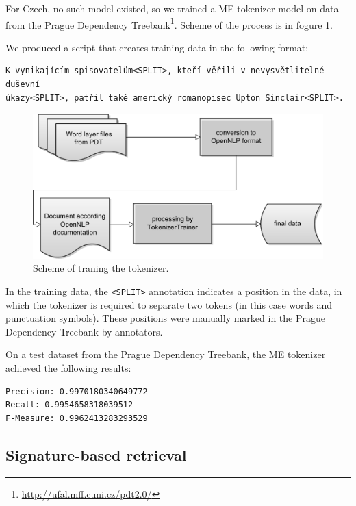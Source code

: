 For Czech, no such model existed, so we trained a ME tokenizer
model on data from the Prague Dependency Treebank\footnote{\url{http://ufal.mff.cuni.cz/pdt2.0/}}. Scheme of the process is in fogure \ref{fig:tokenizer}. 

We produced a script that creates training data in the following format:
\begin{verbatim}
K vynikajícím spisovatelům<SPLIT>, kteří věřili v nevysvětlitelné duševní 
úkazy<SPLIT>, patřil také americký romanopisec Upton Sinclair<SPLIT>.
\end{verbatim}

\begin{figure}[h]
\begin{center}
\includegraphics[scale=0.6]{figures/creatingTokenizationModel.pdf}
\end{center}
\caption{Scheme of traning the tokenizer.}
\label{fig:tokenizer}
\end{figure}

In the training data, the \verb|<SPLIT>| annotation indicates a position in the data, in which the
tokenizer is required to separate two tokens (in this case words and punctuation symbols). These
positions were manually marked in the Prague Dependency Treebank by annotators.

On a test dataset from the Prague Dependency Treebank, the ME tokenizer achieved the following results:

\begin{lstlisting}
Precision: 0.9970180340649772
Recall: 0.9954658318039512
F-Measure: 0.9962413283293529
\end{lstlisting}


\subsection{Signature-based retrieval}


